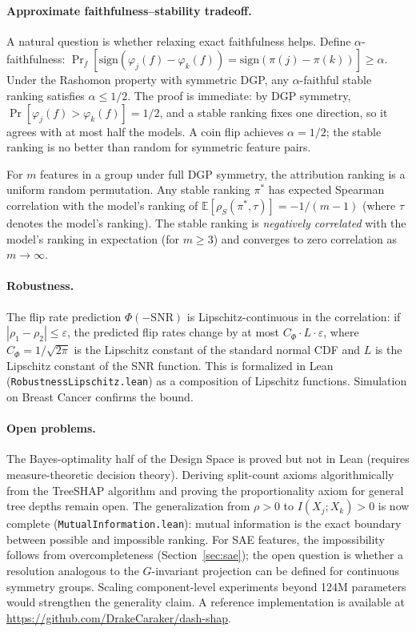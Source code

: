 \documentclass{jmlr}
\newcommand{\E}{\mathbb{E}}
\begin{document}
\paragraph{Approximate faithfulness--stability tradeoff.}
A natural question is whether relaxing exact faithfulness helps. Define $\alpha$-faithfulness: $\Pr_f[\text{sign}(\varphi_j(f) - \varphi_k(f)) = \text{sign}(\pi(j) - \pi(k))] \geq \alpha$. Under the Rashomon property with symmetric DGP, any $\alpha$-faithful stable ranking satisfies $\alpha \leq 1/2$. The proof is immediate: by DGP symmetry, $\Pr[\varphi_j(f) > \varphi_k(f)] = 1/2$, and a stable ranking fixes one direction, so it agrees with at most half the models. A coin flip achieves $\alpha = 1/2$; the stable ranking is no better than random for symmetric feature pairs.

For $m$ features in a group under full DGP symmetry, the attribution ranking is a uniform random permutation. Any stable ranking $\pi^*$ has expected Spearman correlation with the model's ranking of $\E[\rho_S(\pi^*, \tau)] = -1/(m-1)$ (where $\tau$ denotes the model's ranking). The stable ranking is \emph{negatively correlated} with the model's ranking in expectation (for $m \geq 3$) and converges to zero correlation as $m \to \infty$.

\paragraph{Robustness.}
The flip rate prediction $\Phi(-\text{SNR})$ is Lipschitz-continuous in the correlation: if $|\rho_1 - \rho_2| \leq \varepsilon$, the predicted flip rates change by at most $C_\Phi \cdot L \cdot \varepsilon$, where $C_\Phi = 1/\sqrt{2\pi}$ is the Lipschitz constant of the standard normal CDF and $L$ is the Lipschitz constant of the SNR function. This is formalized in Lean (\texttt{RobustnessLipschitz.lean}) as a composition of Lipschitz functions. Simulation on Breast Cancer confirms the bound.

\paragraph{Open problems.}
The Bayes-optimality half of the Design Space is proved but not in Lean (requires measure-theoretic decision theory). Deriving split-count axioms algorithmically from the TreeSHAP algorithm and proving the proportionality axiom for general tree depths remain open. The generalization from $\rho > 0$ to $I(X_j; X_k) > 0$ is now complete (\texttt{MutualInformation.lean}): mutual information is the exact boundary between possible and impossible ranking. For SAE features, the impossibility follows from overcompleteness (Section~\ref{sec:sae}); the open question is whether a resolution analogous to the $G$-invariant projection can be defined for continuous symmetry groups. Scaling component-level experiments beyond 124M parameters would strengthen the generality claim. A reference implementation is available at \url{https://github.com/DrakeCaraker/dash-shap}.
\end{document}
